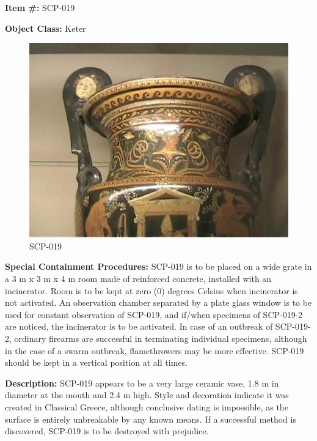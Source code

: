 
\textbf{Item \#:} SCP-019

\textbf{Object Class:} Keter

\begin{figure}[h]
\begin{center}
\includegraphics[scale=0.5]{scp/019a.jpg}
\linebreak SCP-019
\end{center}
\end{figure}

\textbf{Special Containment Procedures:} SCP-019 is to be placed on a wide grate in a 3 m x 3 m x 4 m room made of reinforced concrete, installed with an incinerator. Room is to be kept at zero (0) degrees Celsius when incinerator is not activated. An observation chamber separated by a plate glass window is to be used for constant observation of SCP-019, and if/when specimens of SCP-019-2 are noticed, the incinerator is to be activated. In case of an outbreak of SCP-019-2, ordinary firearms are successful in terminating individual specimens, although in the case of a swarm outbreak, flamethrowers may be more effective. SCP-019 should be kept in a vertical position at all times.

\textbf{Description:} SCP-019 appears to be a very large ceramic vase, 1.8 m in diameter at the mouth and 2.4 m high. Style and decoration indicate it was created in Classical Greece, although conclusive dating is impossible, as the surface is entirely unbreakable by any known means. If a successful method is discovered, SCP-019 is to be destroyed with prejudice.


